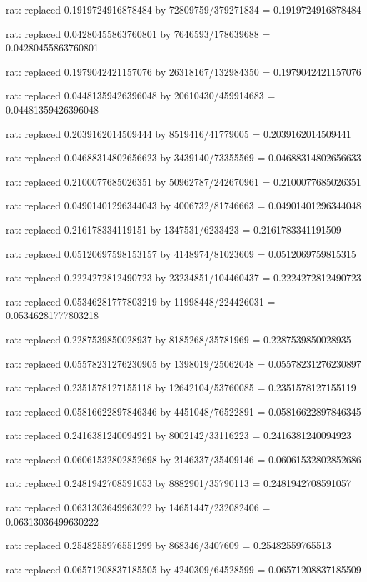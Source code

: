 \documentclass[a4paper,10pt]{article}
\begin{document}
\begin{eulernotebook}
\begin{eulercomment}
\begin{eulercomment}
\begin{eulercomment}
\begin{eulercomment}
\begin{eulercomment}
\begin{eulercomment}
\begin{eulercomment}
\begin{eulercomment}
\begin{eulercomment}
\begin{eulercomment}
\begin{eulercomment}
\begin{eulercomment}
\begin{eulercomment}
\begin{eulercomment}
\begin{eulercomment}
\begin{eulercomment}
\begin{euleroutput}
  rat: replaced 0.1919724916878484 by 72809759/379271834 = 0.1919724916878484
  
  rat: replaced 0.04280455863760801 by 7646593/178639688 = 0.04280455863760801
  
  rat: replaced 0.1979042421157076 by 26318167/132984350 = 0.1979042421157076
  
  rat: replaced 0.04481359426396048 by 20610430/459914683 = 0.04481359426396048
  
  rat: replaced 0.2039162014509444 by 8519416/41779005 = 0.2039162014509441
  
  rat: replaced 0.04688314802656623 by 3439140/73355569 = 0.04688314802656633
  
  rat: replaced 0.2100077685026351 by 50962787/242670961 = 0.2100077685026351
  
  rat: replaced 0.04901401296344043 by 4006732/81746663 = 0.04901401296344048
  
  rat: replaced 0.216178334119151 by 1347531/6233423 = 0.2161783341191509
  
  rat: replaced 0.05120697598153157 by 4148974/81023609 = 0.0512069759815315
  
  rat: replaced 0.2224272812490723 by 23234851/104460437 = 0.2224272812490723
  
  rat: replaced 0.05346281777803219 by 11998448/224426031 = 0.05346281777803218
  
  rat: replaced 0.2287539850028937 by 8185268/35781969 = 0.2287539850028935
  
  rat: replaced 0.05578231276230905 by 1398019/25062048 = 0.05578231276230897
  
  rat: replaced 0.2351578127155118 by 12642104/53760085 = 0.2351578127155119
  
  rat: replaced 0.05816622897846346 by 4451048/76522891 = 0.05816622897846345
  
  rat: replaced 0.2416381240094921 by 8002142/33116223 = 0.2416381240094923
  
  rat: replaced 0.06061532802852698 by 2146337/35409146 = 0.06061532802852686
  
  rat: replaced 0.2481942708591053 by 8882901/35790113 = 0.2481942708591057
  
  rat: replaced 0.0631303649963022 by 14651447/232082406 = 0.06313036499630222
  
  rat: replaced 0.2548255976551299 by 868346/3407609 = 0.25482559765513
  
  rat: replaced 0.06571208837185505 by 4240309/64528599 = 0.06571208837185509
  

\end{euleroutput}
\end{eulercomment}
\end{eulercomment}
\end{eulercomment}
\end{eulercomment}
\end{eulercomment}
\end{eulercomment}
\end{eulercomment}
\end{eulercomment}
\end{eulercomment}
\end{eulercomment}
\end{eulercomment}
\end{eulercomment}
\end{eulercomment}
\end{eulercomment}
\end{eulercomment}
\end{eulercomment}
\end{eulernotebook}
\end{document}
